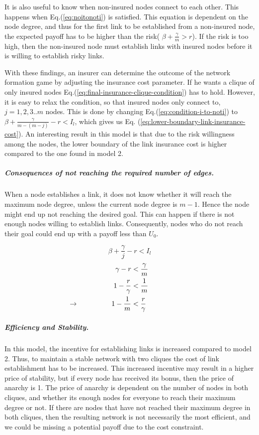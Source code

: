 It is also useful to know when non-insured nodes connect to each other. This happens when Eq.(\ref{eq:noitonoti}) is satisfied. This equation is dependent on the node degree, and thus for the first link to be established from a non-insured node, the expected payoff has to be higher than the risk( $\beta+\frac{\gamma}{m}>r$). If the risk is too high, then the non-insured node must establish links with insured nodes before it is willing to establish risky links.

With these findings, an insurer can determine the outcome of the network formation game by adjusting the insurance cost parameter.
If he wants a clique of only insured nodes Eq.(\ref{eq:final-insurance-clique-condition}) has to
hold. However, it is easy to relax the condition, so that insured nodes only connect to, $j=1,2,3..m$ nodes.
   This is done by changing Eq.(\ref{eq:condition-i-to-noti}) to $\beta+\frac{\gamma}{m-(m-j)}-r<I_{l}$, which
    gives us Eq. (\ref{eq:lower-boundary-link-insurance-cost}).
An interesting result in this model is that due to the risk willingness among the nodes, the lower boundary of the link insurance cost is higher compared to the one found in model 2. 

\subparagraph{Consequences of not reaching the required number of edges.} When a node establishes a link, it does not know whether it will reach the maximum node degree, unless the current node degree is $m-1$. Hence the node might end up not reaching the desired goal. This can happen if there is not enough nodes willing to establish links. Consequently, nodes who do not reach their goal could end up with a payoff less than $U_{0}$. 

\begin{equation} 
\beta+\frac{\gamma}{j}-r<I_{l}
\label{eq:lower-boundary-link-insurance-cost}
\end{equation} 
\begin{eqnarray}
\gamma-r &<\frac{\gamma}{m}\nonumber \\
1-\frac{r}{\gamma}&<\frac{1}{m} \nonumber \\
\llap{$\rightarrow$\hspace{50pt}}1-\frac{1}{m}&<\frac{r}{\gamma}
\label{eq:noinsuredcliqueconditon}
\end{eqnarray}


\subparagraph{Efficiency and Stability.}

In this model, the incentive for establishing links is increased compared to model 2. Thus, to maintain a stable network with two cliques the cost of link establishment has to be increased. This increased incentive may result in a higher price of stability, but if every node has received its bonus, then the price of anarchy is 1. The price of anarchy is dependent on the number of nodes in both cliques, and whether its enough nodes for everyone to reach their maximum degree or not. 
If there are nodes that have not reached their maximum degree in both cliques, then the resulting network is not necessarily the most efficient, and we could be missing a potential payoff due to the cost constraint. 

